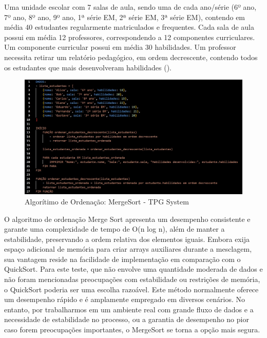 Uma unidade escolar com 7 salas de aula, sendo uma de cada ano/série (6º ano, 7º ano, 8º ano, 9º ano, 1ª série EM, 2ª série EM, 3ª série EM), contendo em média 40 estudantes regularmente matriculados e frequentes. Cada sala de aula possui em média 12 professores, correspondendo a 12 componentes curriculares. Um componente curricular possui em média 30 habilidades. Um professor necessita retirar um relatório pedagógico, em ordem decrescente, contendo todos os estudantes que mais desenvolveram habilidades ().
\\
\begin{figure}[!h]
\centering
\caption{Algorítimo de Ordenação: MergeSort - TPG System}%
\label{fig:MergeSort.jpg}
\includegraphics[scale=0.42]{Illustrations/MergeSort.jpg}
\end{figure}

O algoritmo de ordenação Merge Sort apresenta um desempenho consistente e garante uma complexidade de tempo de O(n log n), além de manter a estabilidade, preservando a ordem relativa dos elementos iguais. Embora exija espaço adicional de memória para criar arrays auxiliares durante a mesclagem, sua vantagem reside na facilidade de implementação em comparação com o QuickSort. Para este teste, que não envolve uma quantidade moderada de dados e não foram mencionadas preocupações com estabilidade ou restrições de memória, o QuickSort poderia ser uma escolha razoável. Este método normalmente oferece um desempenho rápido e é amplamente empregado em diversos cenários. No entanto, por trabalharmos em um ambiente real com grande fluxo de dados e a necessidade de estabilidade no processo, ou a garantia de desempenho no pior caso forem preocupações importantes, o MergeSort se torna a opção mais segura.




